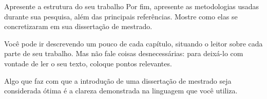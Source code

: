 Apresente a estrutura do seu trabalho
Por fim, apresente as metodologias usadas durante sua pesquisa, além das principais referências. Mostre como elas se concretizaram em sua dissertação de mestrado.

Você pode ir descrevendo um pouco de cada capítulo, situando o leitor sobre cada parte de seu trabalho. Mas não fale coisas desnecessárias: para deixá-lo com vontade de ler o seu texto, coloque pontos relevantes.

Algo que faz com que a introdução de uma dissertação de mestrado seja considerada ótima é a clareza demonstrada na linguagem que você utiliza.

